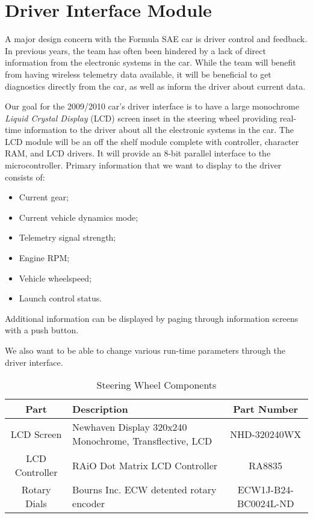 %
%

\section{Driver Interface Module}

A major design concern with the Formula SAE car is driver control and feedback. In previous years, the team has often been hindered by a lack of direct information from the electronic systems in the car. While the team will benefit from having wireless telemetry data available, it will be beneficial to get diagnostics directly from the car, as well as inform the driver about current data.

Our goal for the 2009/2010 car's driver interface is to have a large monochrome \emph{Liquid Crystal Display} (LCD) screen inset in the steering wheel providing real-time information to the driver about all the electronic systems in the car. The LCD module will be an off the shelf module complete with controller, character RAM, and LCD drivers. It will provide an 8-bit parallel interface to the microcontroller. Primary information that we want to display to the driver consists of:
\begin{itemize}
\item Current gear;
\item Current vehicle dynamics mode;
\item Telemetry signal strength;
\item Engine RPM;
\item Vehicle wheelspeed;
\item Launch control status.
\end{itemize}
Additional information can be displayed by paging through information screens with a push button.

We also want to be able to change various run-time parameters through the driver interface.

\begin{table}[H]
\caption{Steering Wheel Components\label{tab:Steering-Wheel-Components}}

\centering{}\begin{tabular}{|c|>{\centering}p{15em}|c|}
\hline 
Part & Description & Part Number\tabularnewline
\hline
\hline 
LCD Screen & Newhaven Display 320x240 Monochrome, Transflective, LCD & NHD-320240WX\tabularnewline
\hline 
LCD Controller & RAiO Dot Matrix LCD Controller & RA8835\tabularnewline
\hline 
Rotary Dials & Bourns Inc. ECW detented rotary encoder & ECW1J-B24-BC0024L-ND\tabularnewline
\hline
\end{tabular}
\end{table}

